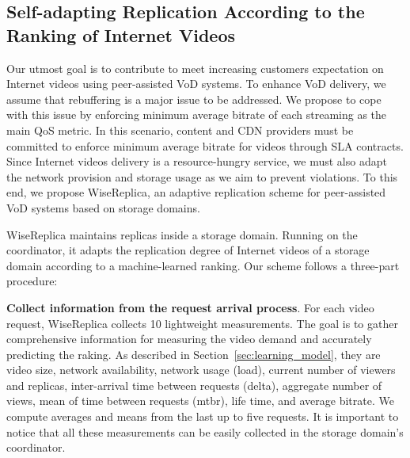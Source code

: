 %



\subsection{Self-adapting Replication According to the Ranking of Internet Videos}
\label{subsec:wisereplica_replication_strategy}

Our utmost goal is to contribute to meet increasing customers expectation on Internet videos using peer-assisted VoD systems. To enhance VoD delivery, we assume that rebuffering is a major issue to be addressed. We propose to cope with this issue by enforcing minimum average bitrate of each streaming as the main QoS metric. In this scenario, content and CDN providers must be committed to enforce minimum average bitrate for videos through SLA contracts. Since Internet videos delivery is a resource-hungry service, we must also adapt the network provision and storage usage as we aim to prevent violations. To this end, we propose WiseReplica, an adaptive replication scheme for peer-assisted VoD systems based on storage domains.

WiseReplica maintains replicas inside a storage domain. Running on the coordinator, it adapts the replication degree of Internet videos of a storage domain according to a machine-learned ranking. Our scheme follows a three-part procedure: 

\noindent
\textbf{Collect information from the request arrival process}. For each video request, WiseReplica collects 10 lightweight measurements. The goal is to gather comprehensive information for measuring the video demand and accurately predicting the raking. As described in Section~\ref{sec:learning_model}, they are video size, network availability, network usage (load), current number of viewers and replicas, inter-arrival time between requests (delta), aggregate number of views, mean of time between requests (mtbr), life time, and average bitrate. We compute averages and means from the last up to five requests. It is important to notice that all these measurements can be easily collected in the storage domain's coordinator.
 
